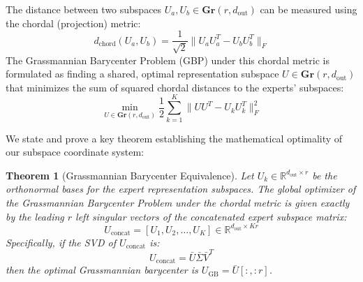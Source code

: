 \documentclass{article}
\theoremstyle{plain}
\newtheorem{theorem}{Theorem}[section]
\theoremstyle{definition}
\theoremstyle{remark}
\begin{document}
The distance between two subspaces $U_a, U_b \in \mathbf{Gr}(r, d_{\text{out}})$ can be measured using the chordal (projection) metric:
\begin{equation}
    d_{\text{chord}}(U_a, U_b) = \frac{1}{\sqrt{2}} \| U_a U_a^T - U_b U_b^T \|_F
\end{equation}
The Grassmannian Barycenter Problem (GBP) under this chordal metric is formulated as finding a shared, optimal representation subspace $U \in \mathbf{Gr}(r, d_{\text{out}})$ that minimizes the sum of squared chordal distances to the experts' subspaces:
\begin{equation}
    \min_{U \in \mathbf{Gr}(r, d_{\text{out}})} \frac{1}{2} \sum_{k=1}^K \| U U^T - U_k U_k^T \|_F^2
\end{equation}

We state and prove a key theorem establishing the mathematical optimality of our subspace coordinate system:
\begin{theorem}[Grassmannian Barycenter Equivalence]
Let $U_k \in \mathbb{R}^{d_{\text{out}} \times r}$ be the orthonormal bases for the expert representation subspaces. The global optimizer of the Grassmannian Barycenter Problem under the chordal metric is given exactly by the leading $r$ left singular vectors of the concatenated expert subspace matrix:
\begin{equation}
    U_{\text{concat}} = [U_1, U_2, \ldots, U_K] \in \mathbb{R}^{d_{\text{out}} \times Kr}
\end{equation}
Specifically, if the SVD of $U_{\text{concat}}$ is:
\begin{equation}
    U_{\text{concat}} = \bar{U} \bar{\Sigma} \bar{V}^T
\end{equation}
then the optimal Grassmannian barycenter is $U_{\text{GB}} = \bar{U}[:, :r]$.
\end{theorem}
\end{document}
